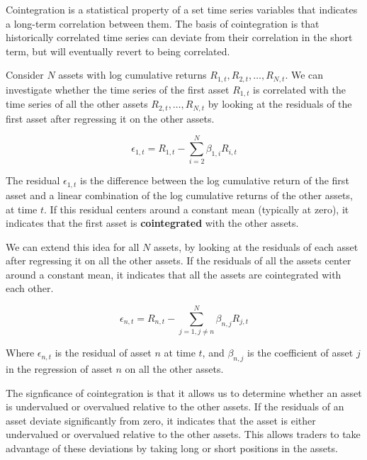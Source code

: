 \documentclass[12pt]{article}
\begin{document}
Cointegration is a statistical property of a set time series variables that indicates a long-term correlation between them. The basis of cointegration is that historically correlated time series can deviate from their correlation in the short term, but will eventually revert to being correlated.

Consider $N$ assets with log cumulative returns $R_{1,t}, R_{2,t}, \ldots, R_{N,t}$. We can investigate whether the time series of the first asset $R_{1,t}$ is correlated with the time series of all the other assets $R_{2,t}, \ldots, R_{N,t}$ by looking at the residuals of the first asset after regressing it on the other assets.

\begin{equation}
\epsilon_{1,t} = R_{1,t} - \sum_{i=2}^{N} \beta_{1,i} R_{i,t}
\label{eq:cointegration_single}
\end{equation}

The residual $\epsilon_{1,t}$ is the difference between the log cumulative return of the first asset and a linear combination of the log cumulative returns of the other assets, at time $t$. If this residual centers around a constant mean (typically at zero), it indicates that the first asset is \textbf{cointegrated} with the other assets.

We can extend this idea for all $N$ assets, by looking at the residuals of each asset after regressing it on all the other assets. If the residuals of all the assets center around a constant mean, it indicates that all the assets are cointegrated with each other.

\begin{equation}
\epsilon_{n,t} = R_{n,t} - \sum_{j=1, j \neq n}^{N} \beta_{n,j} R_{j,t}
\label{eq:cointegration_all}
\end{equation}

Where $\epsilon_{n,t}$ is the residual of asset $n$ at time $t$, and $\beta_{n,j}$ is the coefficient of asset $j$ in the regression of asset $n$ on all the other assets. 

The signficance of cointegration is that it allows us to determine whether an asset is undervalued or overvalued relative to the other assets. If the residuals of an asset deviate significantly from zero, it indicates that the asset is either undervalued or overvalued relative to the other assets. This allows traders to take advantage of these deviations by taking long or short positions in the assets.
\end{document}
